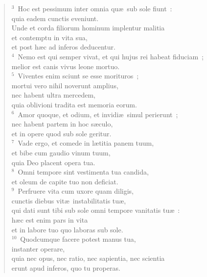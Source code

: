 \begin{flushleft}\begin{verse}${}^{3}$~Hoc est pessimum inter omnia qu\ae\ sub sole fiunt~:\\ quia eadem cunctis eveniunt.\\ Unde et corda filiorum hominum implentur malitia\\ et contemptu in vita sua,\\ et post h\ae c ad inferos deducentur.\\
${}^{4}$~Nemo est qui semper vivat, et qui hujus rei habeat fiduciam~;\\ melior est canis vivus leone mortuo.\\
${}^{5}$~Viventes enim sciunt se esse morituros~;\\ mortui vero nihil noverunt amplius,\\ nec habent ultra mercedem,\\ quia oblivioni tradita est memoria eorum.\\
${}^{6}$~Amor quoque, et odium, et invidi\ae\ simul perierunt~;\\ nec habent partem in hoc s\ae culo,\\ et in opere quod sub sole geritur.\\
${}^{7}$~Vade ergo, et comede in l\ae titia panem tuum,\\ et bibe cum gaudio vinum tuum,\\ quia Deo placent opera tua.\\
${}^{8}$~Omni tempore sint vestimenta tua candida,\\ et oleum de capite tuo non deficiat.\\
${}^{9}$~Perfruere vita cum uxore quam diligis,\\ cunctis diebus vit\ae\ instabilitatis tu\ae ,\\ qui dati sunt tibi sub sole omni tempore vanitatis tu\ae~:\\ h\ae c est enim pars in vita\\ et in labore tuo quo laboras sub sole.\\
${}^{10}$~Quodcumque facere potest manus tua,\\ instanter operare,\\ quia nec opus, nec ratio, nec sapientia, nec scientia\\ erunt apud inferos, quo tu properas.\end{verse}\end{flushleft}



